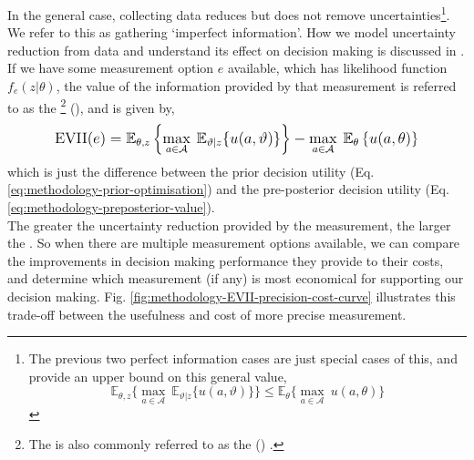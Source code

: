In the general case, collecting data reduces but does not remove uncertainties\footnote{The previous two perfect information cases are just special cases of this, and provide an upper bound on this general value, \begin{equation*} \mathbb{E}_{\theta,z} \big\lbrace \max_{a \in \mathcal{A}} \: \mathbb{E}_{\vartheta|z}\lbrace u(a,\vartheta) \rbrace \big\rbrace \leq \mathbb{E}_{\theta} \big\lbrace \max_{a \in \mathcal{A}} \: u(a,\theta) \big\rbrace \end{equation*}\vspace*{-0.3cm}}.
We refer to this as gathering `imperfect information'. How we model uncertainty reduction from data and understand its effect on decision making is discussed in . If we have some measurement option $e$ available, which has likelihood function $f_e(z|\theta)$, the value of the information provided by that measurement is referred to as the \footnote{The  is also commonly referred to as the  () \citep{keisler2014ValueInformationAnalysis}.} (), and is given by,
\begin{equation} \label{eq:evii}
    \mathlarger{
        \text{EVII}(e) =
        \mathbb{E}_{\theta,z} \left\lbrace \max_{a \in \mathcal{A}} \: \mathbb{E}_{\vartheta|z}\lbrace u(a,\vartheta) \rbrace \right\rbrace
        - \max_{a \in \mathcal{A}} \: \mathbb{E}_{\theta} \left\lbrace u(a,\theta) \right\rbrace
    }
\end{equation}
which is just the difference between the prior decision utility (Eq. \ref{eq:methodology-prior-optimisation}) and the pre-posterior decision utility (Eq. \ref{eq:methodology-preposterior-value}).\\

The greater the uncertainty reduction provided by the measurement, the larger the . So when there are multiple measurement options available, we can compare the improvements in decision making performance they provide to their costs, and determine which measurement (if any) is most economical for supporting our decision making. Fig. \ref{fig:methodology-EVII-precision-cost-curve} illustrates this trade-off between the usefulness and cost of more precise measurement.



